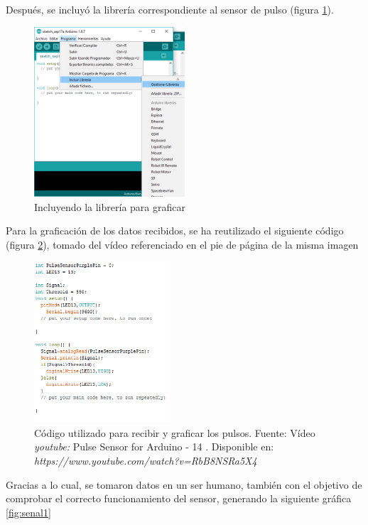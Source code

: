 \documentclass[letterpaper, 10 pt, conference]{ieeeconf}  %
\begin{document}
Despu\'es, se incluy\'o la librer\'ia correspondiente al sensor de pulso (figura \ref{fig:library}).\\

\begin{figure}
\centering
\includegraphics[width=0.5\textwidth]{includeLibrary.png}
\caption{Incluyendo la librer\'ia para graficar}
\label{fig:library}
\end{figure}

Para la graficaci\'on de los datos recibidos, se ha reutilizado el siguiente c\'odigo (figura \ref{fig:code}), tomado del v\'ideo referenciado en el pie de p\'agina de la misma imagen\\

\begin{figure}
\centering
\includegraphics[width=0.45\textwidth]{codeArduino.png}
\caption{C\'odigo utilizado para recibir y graficar los pulsos. Fuente: V\'ideo \textit{youtube:} Pulse Sensor for Arduino - 14 . Disponible en: \textit{https://www.youtube.com/watch?v=RbB8NSRa5X4}}
\label{fig:code}
\end{figure}

Gracias a lo cual, se tomaron datos en un ser humano, tambi\'en con el objetivo de comprobar el correcto funcionamiento del sensor, generando la siguiente gr\'afica \ref{fig:senal1}
 
\end{document}
